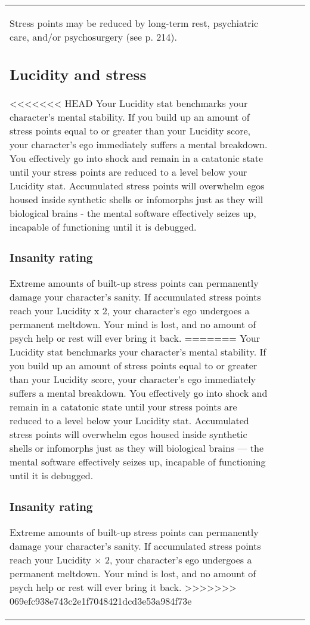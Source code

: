 \begin{table}
\begin{tabular}{|p{8cm}|r|r|r|}
Stress points may be reduced by long-term rest, psychiatric care, and/or psychosurgery (see p. 214). 



\subsection{Lucidity and stress} \label{sec:lucidity-stress} 

<<<<<<< HEAD Your Lucidity stat benchmarks your character’s mental stability. If you build up an amount of stress points equal to or greater than your Lucidity score, your character’s ego immediately suffers a mental breakdown. You effectively go into shock and remain in a catatonic state until your stress points are reduced to a level below your Lucidity stat. Accumulated stress points will overwhelm egos housed inside synthetic shells or infomorphs just as they will biological brains - the mental software effectively seizes up, incapable of functioning until it is debugged. 

\subsubsection{Insanity rating} 

Extreme amounts of built-up stress points can permanently damage your character’s sanity. If accumulated stress points reach your Lucidity x 2, your character’s ego undergoes a permanent meltdown. Your mind is lost, and no amount of psych help or rest will ever bring it back. ======= Your Lucidity stat benchmarks your character’s mental stability. If you build up an amount of stress points equal to or greater than your Lucidity score, your character’s ego immediately suffers a mental breakdown. You effectively go into shock and remain in a catatonic state until your stress points are reduced to a level below your Lucidity stat. Accumulated stress points will overwhelm egos housed inside synthetic shells or infomorphs just as they will biological brains --- the mental software effectively seizes up, incapable of functioning until it is debugged. 

\subsubsection{Insanity rating} 

Extreme amounts of built-up stress points can permanently damage your character’s sanity. If accumulated stress points reach your Lucidity $\times$ 2, your character’s ego undergoes a permanent meltdown. Your mind is lost, and no amount of psych help or rest will ever bring it back. >>>>>>> 069efc938e743c2e1f7048421dcd3e53a984f73e 




\end{tabular}
\end{table}
